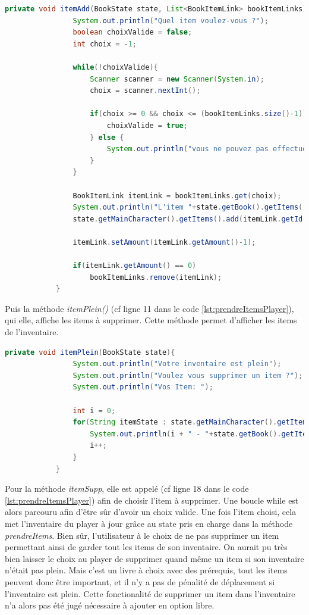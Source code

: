 		\begin{lstlisting}[gobble=12, language=java, caption=itemAdd()]
			private void itemAdd(BookState state, List<BookItemLink> bookItemLinks){
				System.out.println("Quel item voulez-vous ?");
				boolean choixValide = false;
				int choix = -1;

				while(!choixValide){
					Scanner scanner = new Scanner(System.in);
					choix = scanner.nextInt();

					if(choix >= 0 && choix <= (bookItemLinks.size()-1)){
						choixValide = true;
					} else {
						System.out.println("vous ne pouvez pas effectuer ce choix");
					}
				}

				BookItemLink itemLink = bookItemLinks.get(choix);
				System.out.println("L'item "+state.getBook().getItems().get(itemLink.getId()).getName()+" a été rajouté");
				state.getMainCharacter().getItems().add(itemLink.getId());

				itemLink.setAmount(itemLink.getAmount()-1);

				if(itemLink.getAmount() == 0)
					bookItemLinks.remove(itemLink);
			}

		\end{lstlisting}

		Puis la méthode \textit{itemPlein()} (cf ligne 11 dans le code \ref{lst:prendreItemsPlayer}), qui elle, affiche les items à supprimer. Cette méthode permet d'afficher les items de l'inventaire.

		\begin{lstlisting}[gobble=12, language=java, caption=itemPlein()]
			private void itemPlein(BookState state){
				System.out.println("Votre inventaire est plein");
				System.out.println("Voulez vous supprimer un item ?");
				System.out.println("Vos Item: ");

				int i = 0;
				for(String itemState : state.getMainCharacter().getItems()){
					System.out.println(i + " - "+state.getBook().getItems().get(itemState));
					i++;
				}
			}
		\end{lstlisting}

		Pour la méthode \textit{itemSupp}, elle est appelé (cf ligne 18 dans le code \ref{lst:prendreItemsPlayer}) afin de choisir l'item à supprimer. Une boucle while est alors parcouru afin d'être sûr d'avoir un choix valide. Une fois l'item choisi, cela met l'inventaire du player à jour grâce au state pris en charge dans la méthode \textit{prendreItems}. Bien sûr, l'utilisateur à le choix de ne pas supprimer un item permettant ainsi de garder tout les items de son inventaire.
		On aurait pu très bien laisser le choix au player de supprimer quand même un item si son inventaire n'était pas plein. Mais c'est un livre à choix avec des prérequis, tout les items peuvent donc être important, et il n'y a pas de pénalité de déplacement si l'inventaire est plein. Cette fonctionalité de supprimer un item dans l'inventaire n'a alors pas été jugé nécessaire à ajouter en option libre.

